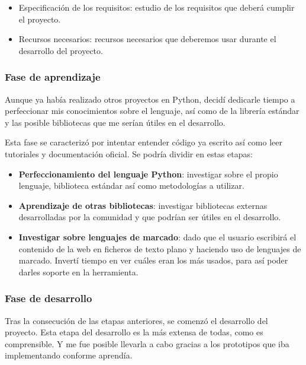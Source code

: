 \documentclass[a4paper,12pt]{article}
\begin{document}
\begin{itemize}
\item Especificación de los requisitos: estudio de los requisitos que deberá cumplir el proyecto.
\item Recursos necesarios: recursos necesarios que deberemos usar durante el desarrollo del proyecto.
\end{itemize}

\subsubsection{Fase de aprendizaje}

Aunque ya había realizado otros proyectos en Python, decidí dedicarle tiempo a perfeccionar mis conocimientos
sobre el lenguaje, así como de la librería estándar y las posible bibliotecas que me serían útiles en el desarrollo.

Esta fase se caracterizó por intentar entender código ya escrito así como leer tutoriales y documentación
oficial. Se podría dividir en estas etapas:

\begin{itemize}
\item \textbf{Perfeccionamiento del lenguaje Python}: investigar sobre el propio lenguaje, biblioteca estándar
así como metodologías a utilizar.
\item \textbf{Aprendizaje de otras bibliotecas}: investigar bibliotecas externas desarrolladas por la comunidad y
que podrían ser útiles en el desarrollo.
\item \textbf{Investigar sobre lenguajes de marcado}: dado que el usuario escribirá el contenido de la web en ficheros
de texto plano y haciendo uso de lenguajes de marcado. Invertí tiempo en ver cuáles eran los más usados, para así poder
darles soporte en la herramienta.
\end{itemize}

\subsubsection{Fase de desarrollo}

Tras la consecución de las etapas anteriores, se comenzó el desarrollo del proyecto. Esta etapa del desarrollo
es la más extensa de todas, como es comprensible. Y me fue posible llevarla a cabo gracias a los
prototipos que iba implementando conforme aprendía.
\end{document}
